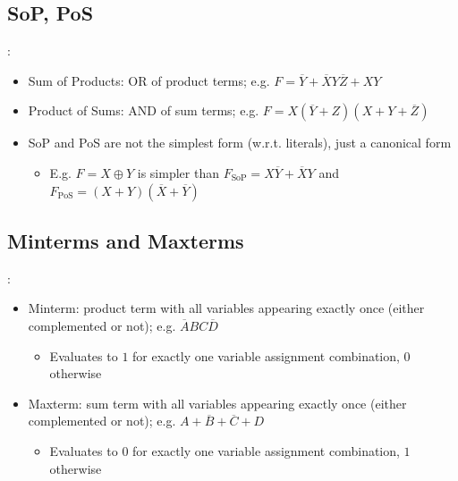 \documentclass{../slides}
\begin{document}
\subsection{SoP, PoS}
\begin{frame}{\secname: \subsecname}
    \begin{itemize}
        \item Sum of Products: OR of product terms; e.g. $F = \overbar{Y} + \overbar{X}Y\overbar{Z} + XY$
        \item Product of Sums: AND of sum terms; e.g. $F = X(\overbar{Y} + Z)(X + Y + \overbar{Z})$
        \item SoP and PoS are not the simplest form (w.r.t. literals), just a canonical form
        \begin{itemize}
            \item E.g. $F = X \oplus Y$ is simpler than $F_{\text{SoP}} = X\overbar{Y} + \overbar{X}Y$ and $F_{\text{PoS}} = (X + Y)(\overbar{X} + \overbar{Y})$
        \end{itemize}
    \end{itemize}
\end{frame}

\subsection{Minterms and Maxterms}
\begin{frame}{\secname: \subsecname}
    \begin{itemize}
        \item Minterm: product term with all variables appearing exactly once (either complemented or not); e.g. $\overbar{A}BC\overbar{D}$
        \begin{itemize}
            \item Evaluates to $1$ for exactly one variable assignment combination, $0$ otherwise
        \end{itemize}
        \item Maxterm: sum term with all variables appearing exactly once (either complemented or not); e.g. $A + \overbar{B} + \overbar{C} + D$
        \begin{itemize}
            \item Evaluates to $0$ for exactly one variable assignment combination, $1$ otherwise
        \end{itemize}
    \end{itemize}
\end{frame}
\end{document}
